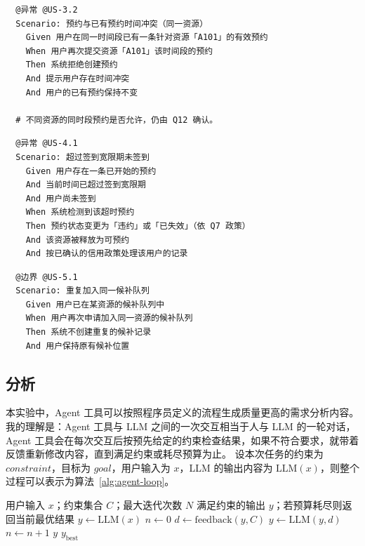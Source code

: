 \documentclass[11pt,a4paper]{article}
\begin{document}
\begin{framed}
\small
\begin{verbatim}
  @异常 @US-3.2
  Scenario: 预约与已有预约时间冲突（同一资源）
    Given 用户在同一时间段已有一条针对资源「A101」的有效预约
    When 用户再次提交资源「A101」该时间段的预约
    Then 系统拒绝创建预约
    And 提示用户存在时间冲突
    And 用户的已有预约保持不变

  # 不同资源的同时段预约是否允许，仍由 Q12 确认。
\end{verbatim}
\end{framed}

\begin{framed}
\small
\begin{verbatim}
  @异常 @US-4.1
  Scenario: 超过签到宽限期未签到
    Given 用户存在一条已开始的预约
    And 当前时间已超过签到宽限期
    And 用户尚未签到
    When 系统检测到该超时预约
    Then 预约状态变更为「违约」或「已失效」（依 Q7 政策）
    And 该资源被释放为可预约
    And 按已确认的信用政策处理该用户的记录
\end{verbatim}
\end{framed}

\begin{framed}
\small
\begin{verbatim}
  @边界 @US-5.1
  Scenario: 重复加入同一候补队列
    Given 用户已在某资源的候补队列中
    When 用户再次申请加入同一资源的候补队列
    Then 系统不创建重复的候补记录
    And 用户保持原有候补位置
\end{verbatim}
\end{framed}

\subsection{分析}
本实验中，Agent 工具可以按照程序员定义的流程生成质量更高的需求分析内容。我的理解是：Agent 工具与 LLM 之间的一次交互相当于人与 LLM 的一轮对话，Agent 工具会在每次交互后按预先给定的约束检查结果，如果不符合要求，就带着反馈重新修改内容，直到满足约束或耗尽预算为止。
设本次任务的约束为 $\mathit{constraint}$，目标为 $\mathit{goal}$，用户输入为 $x$，LLM 的输出内容为 $\mathrm{LLM}(x)$，则整个过程可以表示为算法~\ref{alg:agent-loop}。

\begin{algorithm}[htbp]
  \caption{Agent 的“生成—校验—修正”迭代过程}
  \label{alg:agent-loop}
  \begin{algorithmic}[1]
    \Require 用户输入 $x$；约束集合 $C$；最大迭代次数 $N$
    \Ensure 满足约束的输出 $y$；若预算耗尽则返回当前最优结果
    \State $y \gets \mathrm{LLM}(x)$
    \State $n \gets 0$
      \State $d \gets \mathrm{feedback}(y, C)$ 
      \State $y \gets \mathrm{LLM}(y, d)$ 
      \State $n \gets n + 1$
    \EndWhile
      \State \Return $y$
    \Else
      \State \Return $y_{\text{best}}$ 
    \EndIf
  \end{algorithmic}
\end{algorithm}
\end{document}
